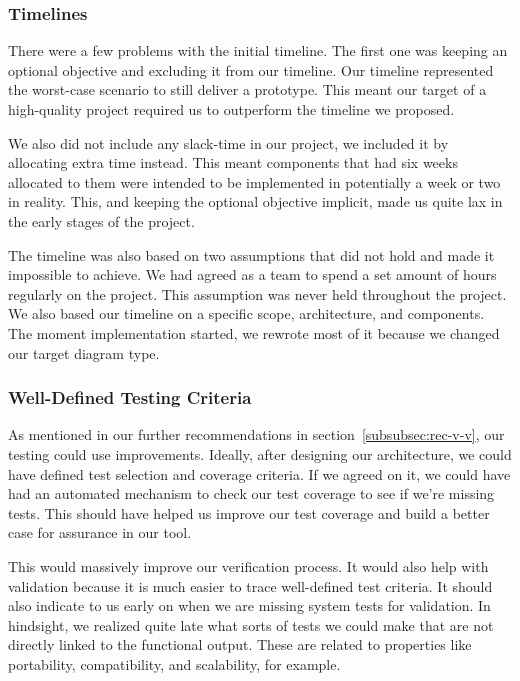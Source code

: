 \subsubsection{Timelines}
There were a few problems with the initial timeline.
The first one was keeping an optional objective and excluding it from our timeline.
Our timeline represented the worst-case scenario to still deliver a prototype.
This meant our target of a high-quality project required us to outperform the timeline we proposed.

We also did not include any slack-time in our project, we included it by allocating extra time instead.
This meant components that had six weeks allocated to them were intended to be implemented in potentially a week or two in reality.
This, and keeping the optional objective implicit, made us quite lax in the early stages of the project.

The timeline was also based on two assumptions that did not hold and made it impossible to achieve.
We had agreed as a team to spend a set amount of hours regularly on the project.
This assumption was never held throughout the project.
We also based our timeline on a specific scope, architecture, and components.
The moment implementation started, we rewrote most of it because we changed our target diagram type.

\subsubsection{Well-Defined Testing Criteria}
As mentioned in our further recommendations in section~\ref{subsubsec:rec-v-v}, our testing could use improvements.
Ideally, after designing our architecture, we could have defined test selection and coverage criteria.
If we agreed on it, we could have had an automated mechanism to check our test coverage to see if we're missing tests.
This should have helped us improve our test coverage and build a better case for assurance in our tool.

This would massively improve our verification process.
It would also help with validation because it is much easier to trace well-defined test criteria.
It should also indicate to us early on when we are missing system tests for validation.
In hindsight, we realized quite late what sorts of tests we could make that are not directly linked to the functional output.
These are related to properties like portability, compatibility, and scalability, for example.